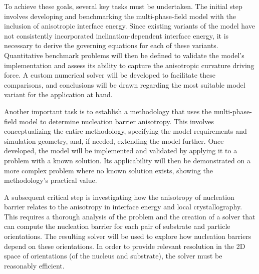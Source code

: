 \noindent{}



To achieve these goals, several key tasks must be undertaken. The initial step involves developing and benchmarking the multi-phase-field model with the inclusion of anisotropic interface energy. Since existing variants of the model have not consistently incorporated inclination-dependent interface energy, it is necessary to derive the governing equations for each of these variants. Quantitative benchmark problems will then be defined to validate the model's implementation and assess its ability to capture the anisotropic curvature driving force. A custom numerical solver will be developed to facilitate these comparisons, and conclusions will be drawn regarding the most suitable model variant for the application at hand.

Another important task is to establish a methodology that uses the multi-phase-field model to determine nucleation barrier anisotropy. This involves conceptualizing the entire methodology, specifying the model requirements and simulation geometry, and, if needed, extending the model further. Once developed, the model will be implemented and validated by applying it to a problem with a known solution. Its applicability will then be demonstrated on a more complex problem where no known solution exists, showing the methodology’s practical value.

A subsequent critical step is investigating how the anisotropy of nucleation barrier relates to the anisotropy in interface energy and local crystallography. This requires a thorough analysis of the problem and the creation of a solver that can compute the nucleation barrier for each pair of substrate and particle orientations. The resulting solver will be used to explore how nucleation barriers depend on these orientations. In order to provide relevant resolution in the 2D space of orientations (of the nucleus and substrate), the solver must be reasonably efficient.

